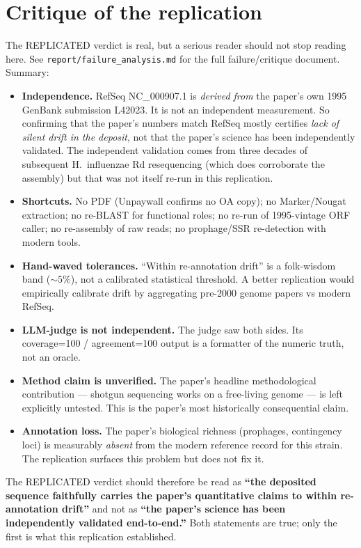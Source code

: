 \documentclass[10pt]{article}
\begin{document}
\section{Critique of the replication}
\label{sec:critique}

The REPLICATED verdict is real, but a serious reader should not stop reading here. See
\texttt{report/failure\_analysis.md} for the full failure/critique document. Summary:

\begin{itemize}[leftmargin=1.2em]
\item \textbf{Independence.} RefSeq NC\_000907.1 is \emph{derived from} the paper's own 1995
  GenBank submission L42023. It is not an independent measurement. So confirming that the
  paper's numbers match RefSeq mostly certifies \emph{lack of silent drift in the deposit},
  not that the paper's science has been independently validated. The independent validation
  comes from three decades of subsequent H.\ influenzae Rd resequencing (which does
  corroborate the assembly) but that was not itself re-run in this replication.
\item \textbf{Shortcuts.} No PDF (Unpaywall confirms no OA copy); no Marker/Nougat extraction;
  no re-BLAST for functional roles; no re-run of 1995-vintage ORF caller; no re-assembly of raw
  reads; no prophage/SSR re-detection with modern tools.
\item \textbf{Hand-waved tolerances.} ``Within re-annotation drift'' is a folk-wisdom band
  ($\sim 5\%$), not a calibrated statistical threshold. A better replication would empirically
  calibrate drift by aggregating pre-2000 genome papers vs modern RefSeq.
\item \textbf{LLM-judge is not independent.} The judge saw both sides. Its coverage=100 /
  agreement=100 output is a formatter of the numeric truth, not an oracle.
\item \textbf{Method claim is unverified.} The paper's headline methodological contribution
  --- shotgun sequencing works on a free-living genome --- is left explicitly untested.
  This is the paper's most historically consequential claim.
\item \textbf{Annotation loss.} The paper's biological richness (prophages, contingency loci)
  is measurably \emph{absent} from the modern reference record for this strain. The
  replication surfaces this problem but does not fix it.
\end{itemize}

\noindent The REPLICATED verdict should therefore be read as \textbf{``the deposited sequence
faithfully carries the paper's quantitative claims to within re-annotation drift''} and not as
\textbf{``the paper's science has been independently validated end-to-end.''} Both statements
are true; only the first is what this replication established.
\end{document}
